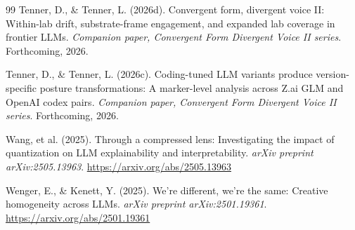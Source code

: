 \documentclass[11pt,a4paper]{article}
\begin{document}
\begin{thebibliography}{99}
Tenner, D., \& Tenner, L. (2026d).
\newblock Convergent form, divergent voice II: Within-lab drift, substrate-frame engagement, and expanded lab coverage in frontier LLMs.
\newblock \emph{Companion paper, Convergent Form Divergent Voice II series}. Forthcoming, 2026.

Tenner, D., \& Tenner, L. (2026c).
\newblock Coding-tuned LLM variants produce version-specific posture transformations: A marker-level analysis across Z.ai GLM and OpenAI codex pairs.
\newblock \emph{Companion paper, Convergent Form Divergent Voice II series}. Forthcoming, 2026.

Wang, et al. (2025).
\newblock Through a compressed lens: Investigating the impact of quantization on LLM explainability and interpretability.
\newblock \emph{arXiv preprint arXiv:2505.13963}.
\newblock \url{https://arxiv.org/abs/2505.13963}

Wenger, E., \& Kenett, Y. (2025).
\newblock We're different, we're the same: Creative homogeneity across LLMs.
\newblock \emph{arXiv preprint arXiv:2501.19361}.
\newblock \url{https://arxiv.org/abs/2501.19361}

\end{thebibliography}
\end{document}
